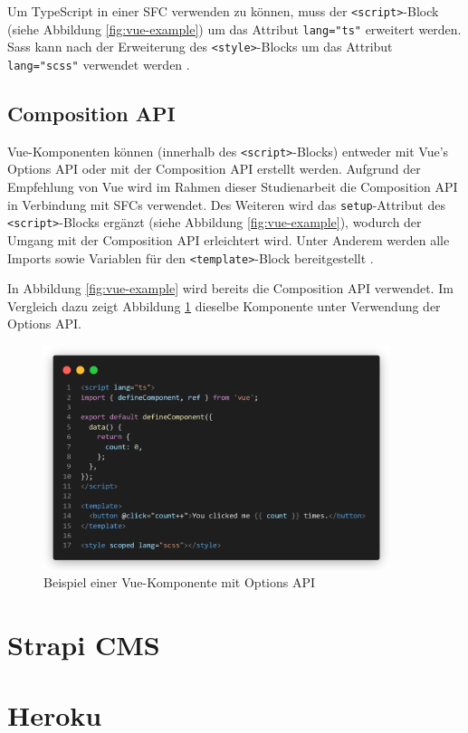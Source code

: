 Um TypeScript in einer \ac{SFC} verwenden zu können, muss der \lstinline{<script>}-Block (siehe Abbildung \ref{fig:vue-example}) um das Attribut \lstinline{lang="ts"} erweitert werden. Sass kann nach der Erweiterung des \lstinline{<style>}-Blocks um das Attribut \lstinline{lang="scss"} verwendet werden \cite[vgl.][]{VueSFC}.

%
%
\subsection{Composition API}
Vue-Komponenten können (innerhalb des \lstinline{<script>}-Blocks) entweder mit Vue's Options API oder mit der Composition API erstellt werden. Aufgrund der Empfehlung von Vue wird im Rahmen dieser Studienarbeit die Composition API in Verbindung mit \acp{SFC} verwendet. Des Weiteren wird das \lstinline{setup}-Attribut des \lstinline{<script>}-Blocks ergänzt (siehe Abbildung \ref{fig:vue-example}), wodurch der Umgang mit der Composition API erleichtert wird. Unter Anderem werden alle Imports sowie Variablen für den \lstinline{<template>}-Block bereitgestellt \cite[vgl.][]{VueIntroduction}.

In Abbildung \ref{fig:vue-example} wird bereits die Composition API verwendet. Im Vergleich dazu zeigt Abbildung \ref{fig:vue-example-options-api} dieselbe Komponente unter Verwendung der Options API.

\begin{figure}[!htb]
  \includegraphics[width=0.9\textwidth]{images/vue-example-options-api.png}
  \centering
  \caption[Beispiel einer Vue-Komponente mit Options API]{Beispiel einer Vue-Komponente mit Options API \cites[vgl.][]{VueIntroduction}[vgl.][]{VueSFC}}
  \label{fig:vue-example-options-api}
\end{figure}

%
%
\section{Strapi CMS}

%
%
\section{Heroku}
